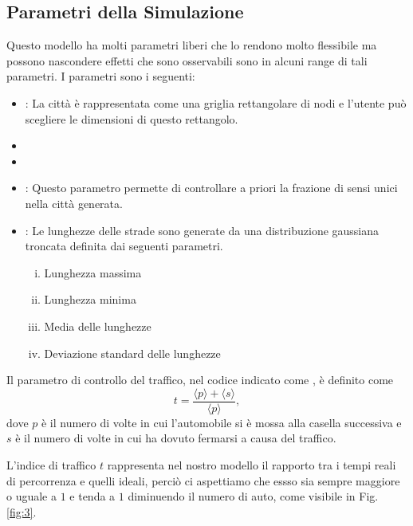 \documentclass[main.tex]{subfiles}
\begin{document}
\subsection{Parametri della Simulazione }

Questo modello ha molti parametri liberi che lo rendono molto flessibile ma possono nascondere effetti che sono osservabili sono in alcuni range di 
tali parametri. 
I parametri sono i seguenti:
\begin{itemize}
    \item {}:
        La città è rappresentata come una griglia rettangolare di nodi e l'utente
        può scegliere le dimensioni di questo rettangolo.
    \item {}
    \item {}
    \item {}:
        Questo parametro permette di controllare a priori la frazione di sensi unici nella città generata.
    \item {}:
        Le lunghezze delle strade sono generate da una distribuzione gaussiana troncata definita dai seguenti parametri.
        \begin{enumerate}[(i)]
            \item Lunghezza massima
            \item Lunghezza minima
            \item Media delle lunghezze
            \item Deviazione standard delle lunghezze
        \end{enumerate}
\end{itemize}

Il parametro di controllo del traffico, nel codice indicato come , è definito come
\[ t =  \frac{\langle p \rangle + \langle s \rangle}{\langle p \rangle}, \]
dove $p$ è il numero di volte in cui l'automobile si è mossa alla casella successiva e $s$ è il numero di volte in cui ha dovuto
fermarsi a causa del traffico.

L'indice di traffico $t$ rappresenta nel nostro modello il rapporto tra i tempi reali di percorrenza e quelli ideali, perciò ci aspettiamo che 
essso sia sempre maggiore o uguale a $1$ e tenda a $1$ diminuendo il numero di auto, come visibile in Fig. \ref{fig:3}.
\end{document}
